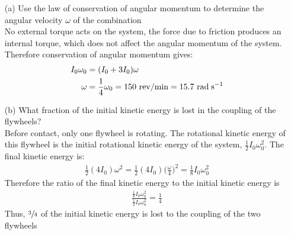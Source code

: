 \documentclass[a4paper]{article}
\newcommand\rads{\text{ rad\;s}^{-1}}
\newcommand{\AxisRotator}[1][rotate=0]{%
    \tikz [x=0.25cm,y=0.60cm,line width=.2ex,-stealth,#1] \draw (0,0) arc (-150:150:1 and 1);%
}
\begin{document}
\begin{shaded}
\begin{center}
    \end{center}
    \begin{enumerate}
        \item[(a)] Use the law of conservation of angular momentum to determine the angular velocity $\omega$ of the combination\vspace{1mm}\\
        No external torque acts on the system, the force due to friction produces an internal torque, which does not affect the angular momentum of the system. Therefore conservation of angular momentum gives:
        \begin{align*}
            I_0\omega_0 &= (I_0 + 3I_0)\omega\\
            \omega &= \frac{1}{4}\omega_0 = 150\text{ rev/min} = 15.7\rads
        \end{align*}
        \item[(b)] What fraction of the initial kinetic energy is lost in the coupling of the flywheels?\vspace{1mm}\\
        Before contact, only one flywheel is rotating. The rotational kinetic energy of this flywheel is the initial rotational kinetic energy of the system, $\frac{1}{2}I_0\omega^2_0$. The final kinetic energy is:
        \begin{align*}
            \frac{1}{2}(4I_0)\omega^2 = \frac{1}{2}(4I_0)\Big(\frac{\omega}{4}\Big)^2 = \frac{1}{8}I_0\omega_0^2
        \end{align*}
        Therefore the ratio of the final kinetic energy to the initial kinetic energy is 
        \begin{align*}
            \frac{\frac{1}{8}I_0\omega_0^2}{\frac{1}{2}I_0\omega_0^2} = \frac{1}{4}
        \end{align*}
        Thus, $\sfrac{3}{4}$ of the initial kinetic energy is lost to the coupling of the two flywheels
    \end{enumerate}
\end{shaded}
\end{document}
